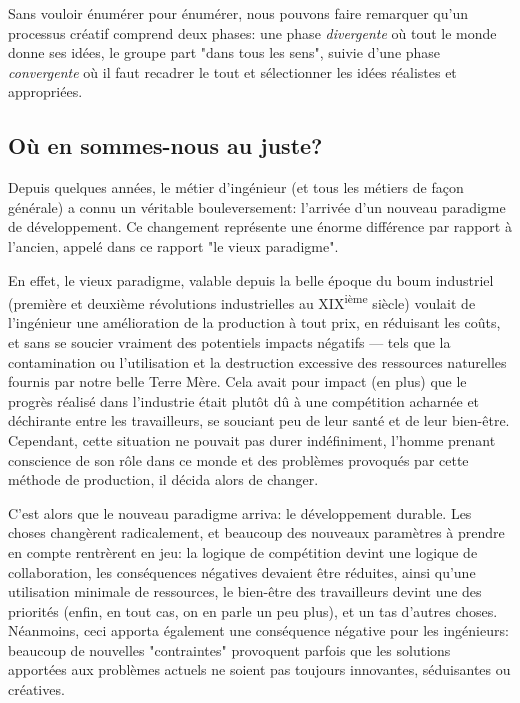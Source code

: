 Sans vouloir énumérer pour énumérer, nous pouvons faire remarquer qu'un processus créatif comprend deux phases: une phase \textit{divergente} où tout le monde donne ses idées, le groupe part "dans tous les sens", suivie d'une phase \textit{convergente} où il faut recadrer le tout et sélectionner les idées réalistes et appropriées.

\subsection{Où en sommes-nous au juste?}

Depuis quelques années, le métier d’ingénieur (et tous les métiers de façon générale) a connu un véritable bouleversement: l'arrivée d'un nouveau paradigme de développement. Ce changement représente une énorme différence par rapport à l'ancien, appelé dans ce rapport "le vieux paradigme". 

En effet, le vieux paradigme, valable depuis la belle époque du boum industriel (première et deuxième révolutions industrielles au XIX\textsuperscript{ième} siècle) voulait de l’ingénieur une amélioration de la production à tout prix, en réduisant les coûts, et sans se soucier vraiment des potentiels impacts négatifs --- tels que la contamination ou l'utilisation et la destruction excessive des ressources naturelles fournis par notre belle Terre Mère. Cela avait pour impact (en plus) que le progrès réalisé dans l'industrie était plutôt dû à une compétition acharnée et déchirante entre les travailleurs, se souciant peu de leur santé et de leur bien-être. Cependant, cette situation ne pouvait pas durer indéfiniment, l'homme prenant conscience de son rôle dans ce monde et des problèmes provoqués par cette méthode de production, il décida alors de changer.

C'est alors que le nouveau paradigme arriva: le développement durable. Les choses changèrent radicalement, et beaucoup des nouveaux paramètres à prendre en compte rentrèrent en jeu: la logique de compétition devint une logique de collaboration, les conséquences négatives devaient être réduites, ainsi qu'une utilisation minimale de ressources, le bien-être des travailleurs devint une des priorités (enfin, en tout cas, on en parle un peu plus), et un tas d'autres choses. Néanmoins, ceci apporta également une conséquence négative pour les ingénieurs: beaucoup de nouvelles "contraintes" provoquent parfois que les solutions apportées aux problèmes actuels ne soient pas toujours innovantes, séduisantes ou créatives.


